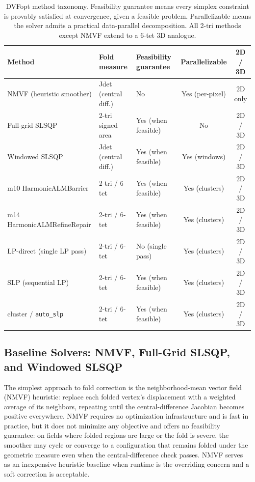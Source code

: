 \documentclass[lettersize,journal]{IEEEtran}
\begin{document}
\begin{table}[ht]
\centering
\caption{DVFopt method taxonomy. Feasibility guarantee means every simplex constraint is provably satisfied at convergence, given a feasible problem. Parallelizable means the solver admits a practical data-parallel decomposition. All 2-tri methods except NMVF extend to a 6-tet 3D analogue.}
\label{tab:method_taxonomy}
\renewcommand{\arraystretch}{1.2}
\begin{tabular}{lllcc}
\toprule
\textbf{Method} & \textbf{Fold measure} & \textbf{Feasibility guarantee} & \textbf{Parallelizable} & \textbf{2D / 3D} \\
\midrule
NMVF (heuristic smoother)       & Jdet (central diff.) & No                  & Yes (per-pixel) & 2D only \\
Full-grid SLSQP                  & 2-tri signed area    & Yes (when feasible) & No              & 2D / 3D \\
Windowed SLSQP                  & Jdet (central diff.) & Yes (when feasible) & Yes (windows)   & 2D / 3D \\
\midrule
m10 HarmonicALMBarrier           & 2-tri / 6-tet        & Yes (when feasible) & Yes (clusters)  & 2D / 3D \\
m14 HarmonicALMRefineRepair      & 2-tri / 6-tet        & Yes (when feasible) & Yes (clusters)  & 2D / 3D \\
\midrule
LP-direct (single LP pass)       & 2-tri / 6-tet        & No (single pass)    & Yes (clusters)  & 2D / 3D \\
SLP (sequential LP)              & 2-tri / 6-tet        & Yes (when feasible) & Yes (clusters)  & 2D / 3D \\
cluster / \texttt{auto\_slp}     & 2-tri / 6-tet        & Yes (when feasible) & Yes (clusters)  & 2D / 3D \\
\bottomrule
\end{tabular}
\end{table}

\subsection{Baseline Solvers: NMVF, Full-Grid SLSQP, and Windowed SLSQP}
\label{sec:baseline_solvers}

The simplest approach to fold correction is the neighborhood-mean vector field (NMVF) heuristic: replace each folded vertex's displacement with a weighted average of its neighbors, repeating until the central-difference Jacobian becomes positive everywhere. NMVF requires no optimization infrastructure and is fast in practice, but it does not minimize any objective and offers no feasibility guarantee: on fields where folded regions are large or the fold is severe, the smoother may cycle or converge to a configuration that remains folded under the geometric measure even when the central-difference check passes. NMVF serves as an inexpensive heuristic baseline when runtime is the overriding concern and a soft correction is acceptable.
\end{document}
